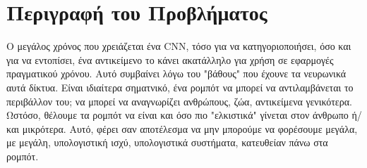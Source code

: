 \section{Περιγραφή του Προβλήματος}
\label{section:problem_description}

Ο μεγάλος χρόνος που χρειάζεται ένα CNN, τόσο για να κατηγοριοποιήσει, όσο και
για να εντοπίσει, ένα αντικείμενο το κάνει ακατάλληλο για χρήση σε εφαρμογές πραγματικού
χρόνου. Αυτό συμβαίνει λόγω του "βάθους" που έχουνε τα νευρωνικά αυτά δίκτυα.
Είναι ιδιαίτερα σηματνικό, ένα ρομπότ να μπορεί να αντιλαμβάνεται το περιβάλλον
του; να μπορεί να αναγνωρίζει ανθρώπους, ζώα, αντικείμενα γενικότερα. Ωστόσο,
θέλουμε τα ρομπότ να είναι και όσο πιο "ελκιστικά" γίνεται στον άνθρωπο ή/και μικρότερα.
Αυτό, φέρει σαν αποτέλεσμα να μην μπορούμε να φορέσουμε μεγάλα, με μεγάλη,
υπολογιστική ισχύ, υπολογιστικά συστήματα, κατευθείαν πάνω στα ρομπότ.

